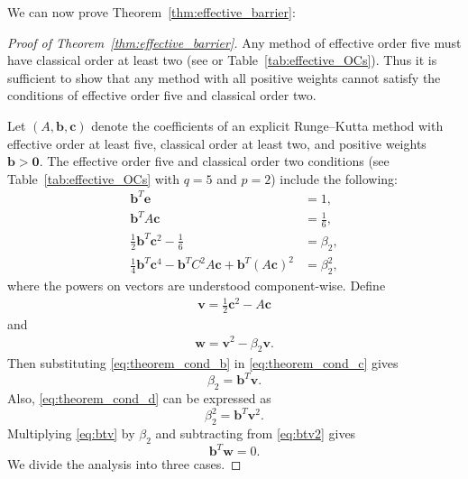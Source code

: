 We can now prove Theorem~\ref{thm:effective_barrier}:
\begin{proof}[Proof of Theorem~\ref{thm:effective_barrier}]
	Any method of effective order five must have classical order at least two
	(see \cite{Butcher2008_book} or Table~\ref{tab:effective_OCs}).
    Thus it is sufficient to show that any method with all positive weights
    cannot satisfy the conditions of effective order five and classical order two.

    Let $(A,\bm{b},\bm{c})$ denote the coefficients of an explicit Runge--Kutta method with
    effective order at least five, classical order at least two, and positive 
    weights $\bm{b} > \bm{0}$.
    The effective order five and classical order two conditions
    (see Table~\ref{tab:effective_OCs} with $q=5$ and $p=2$) include the following:
    \begin{subequations}\label{eq:theorem_cond}
    		\begin{align}
    			\bm{b}^T\bm{e} & = 1, \label{eq:theorem_cond_a} \\
             	\bm{b}^TA\bm{c} &= \frac{1}{6}, \label{eq:theorem_cond_b} \\
            	\frac{1}{2}\bm{b}^T\bm{c}^2 - \frac{1}{6} &= \beta_2, \label{eq:theorem_cond_c} \\
            	\frac{1}{4}\bm{b}^T\bm{c}^4 - \bm{b}^TC^2A\bm{c} + \bm{b}^T(A\bm{c})^2 &= \beta_2^2, \label{eq:theorem_cond_d}
        	\end{align}
	\end{subequations}
	where the powers on vectors are understood component-wise. 
	Define
	\begin{align*} 
		\bm{v} = \frac{1}{2}\bm{c}^2 - A\bm{c}
	\end{align*}
	and
	\begin{align}\label{eq:def_w}
		\bm{w} = \bm{v}^{2} - \beta_{2}\bm{v}.
	\end{align}
	Then substituting \eqref{eq:theorem_cond_b} in \eqref{eq:theorem_cond_c} gives
	\begin{equation}\label{eq:btv}
		\beta_2 = \bm{b}^T\bm{v}.
	\end{equation}
	Also, \eqref{eq:theorem_cond_d} can be expressed as
	\begin{equation}\label{eq:btv2}
		\beta_2^2 = \bm{b}^T\bm{v}^2.
	\end{equation}
        Multiplying \eqref{eq:btv} by $\beta_2$ and subtracting
        from \eqref{eq:btv2} gives
	\begin{equation}\label{eq:btw}
		\bm{b}^T\bm{w} = 0.
	\end{equation}
        We divide the analysis into three cases.

\end{proof}
